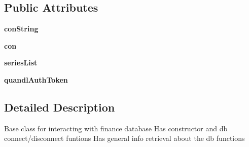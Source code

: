 \subsection*{\-Public \-Attributes}
\begin{DoxyCompactItemize}
\item 
\hypertarget{classDataHandler_1_1DataHandlerBase_1_1DataHandlerBase_ae993313ec360c8a18a56ec57107c1914}{{\bfseries con\-String}}\label{classDataHandler_1_1DataHandlerBase_1_1DataHandlerBase_ae993313ec360c8a18a56ec57107c1914}

\item 
\hypertarget{classDataHandler_1_1DataHandlerBase_1_1DataHandlerBase_ab1697cc5009fade9c79efaab34093f4f}{{\bfseries con}}\label{classDataHandler_1_1DataHandlerBase_1_1DataHandlerBase_ab1697cc5009fade9c79efaab34093f4f}

\item 
\hypertarget{classDataHandler_1_1DataHandlerBase_1_1DataHandlerBase_a15a1abefacd08e9c189e17cb1b34f108}{{\bfseries series\-List}}\label{classDataHandler_1_1DataHandlerBase_1_1DataHandlerBase_a15a1abefacd08e9c189e17cb1b34f108}

\item 
\hypertarget{classDataHandler_1_1DataHandlerBase_1_1DataHandlerBase_a7d5dd00d19c83006cb4ac55bef17f9f5}{{\bfseries quandl\-Auth\-Token}}\label{classDataHandler_1_1DataHandlerBase_1_1DataHandlerBase_a7d5dd00d19c83006cb4ac55bef17f9f5}

\end{DoxyCompactItemize}


\subsection{\-Detailed \-Description}
\begin{DoxyVerb}
Base class for interacting with finance database
Has constructor and db connect/disconnect funtions
Has general info retrieval about the db functions 
\end{DoxyVerb}
 

